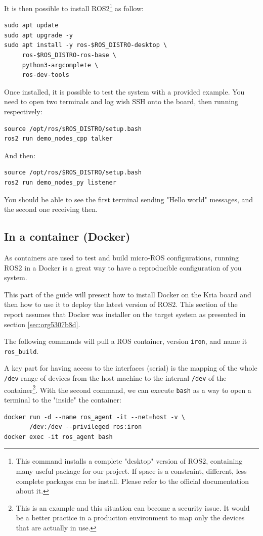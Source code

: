 \documentclass[10pt]{article}
\begin{document}
It is then possible to install ROS2\footnote{This command installs a complete "desktop" version of ROS2, containing many
useful package for our project.
If space is a constraint, different, less complete packages can be install.
Please refer to the official documentation about it.} as follow:
\begin{verbatim}
sudo apt update
sudo apt upgrade -y
sudo apt install -y ros-$ROS_DISTRO-desktop \
     ros-$ROS_DISTRO-ros-base \
     python3-argcomplete \
     ros-dev-tools
\end{verbatim}

Once installed, it is possible to test the system with a provided example.
You need to open two terminals and log wish SSH onto the board, then running
respectively:
\begin{verbatim}
source /opt/ros/$ROS_DISTRO/setup.bash
ros2 run demo_nodes_cpp talker
\end{verbatim}

And then:
\begin{verbatim}
source /opt/ros/$ROS_DISTRO/setup.bash
ros2 run demo_nodes_py listener
\end{verbatim}

You should be able to see the first terminal sending "Hello world" messages,
and the second one receiving then.

\subsection{In a container (Docker)}
\label{sec:org6a5db19}
As containers are used to test and build micro-ROS configurations,
running ROS2 in a Docker  is a great way to have a reproducible configuration
of you system.

This part of the guide will present how to install Docker on the
Kria board and then how to use it to deploy the latest version of ROS2.
This section of the report assumes that Docker was installer on the target system
as presented in section \ref{sec:org5307b8d}.

The following commands will pull a ROS container, version \texttt{iron}, and name it \texttt{ros\_build}.

A key part for having access to the interfaces (serial) is the mapping of the whole \texttt{/dev}
range of devices from the host machine to the internal \texttt{/dev} of the container\footnote{This is an example and this situation can become a security issue. It would be a better practice
in a production environment to map only the devices that are actually in use.}.
With the second command, we can execute \texttt{bash} as a way to open a terminal to the "inside" the container:
\begin{verbatim}
docker run -d --name ros_agent -it --net=host -v \
       /dev:/dev --privileged ros:iron
docker exec -it ros_agent bash
\end{verbatim}
\end{document}
